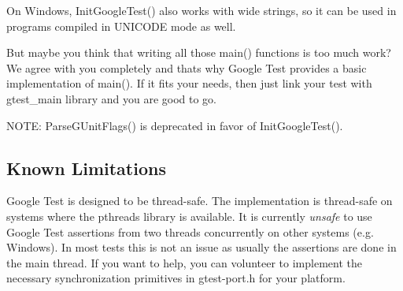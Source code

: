 On Windows, {\ttfamily Init\+Google\+Test()} also works with wide strings, so it can be used in programs compiled in {\ttfamily U\+N\+I\+C\+O\+DE} mode as well.

But maybe you think that writing all those main() functions is too much work? We agree with you completely and that\textquotesingle{}s why Google Test provides a basic implementation of main(). If it fits your needs, then just link your test with gtest\+\_\+main library and you are good to go.

N\+O\+TE\+: {\ttfamily Parse\+G\+Unit\+Flags()} is deprecated in favor of {\ttfamily Init\+Google\+Test()}.

\subsection*{Known Limitations}


\begin{DoxyItemize}
\item Google Test is designed to be thread-\/safe. The implementation is thread-\/safe on systems where the {\ttfamily pthreads} library is available. It is currently {\itshape unsafe} to use Google Test assertions from two threads concurrently on other systems (e.\+g. Windows). In most tests this is not an issue as usually the assertions are done in the main thread. If you want to help, you can volunteer to implement the necessary synchronization primitives in {\ttfamily gtest-\/port.\+h} for your platform. 
\end{DoxyItemize}